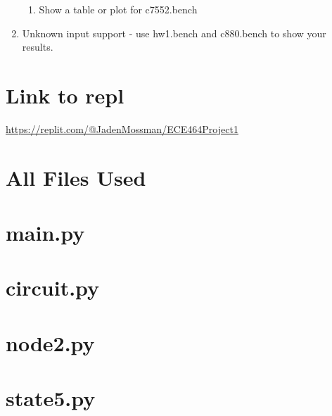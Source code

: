 \documentclass{article}
\begin{document}
\begin{enumerate}[label=\Alph*.]
\begin{enumerate}[label=\roman*.]
                \item Show a table or plot for c7552.bench
                
            \end{enumerate}
            
            \item Unknown input support - use hw1.bench and c880.bench to show your results.
        \end{enumerate}

    \section{Link to repl}
        \url{https://replit.com/@JadenMossman/ECE464Project1}
    
    \newpage
    \section{All Files Used}
        \newcommand{\FileUsed}[1]{\section*{ #1 }}
        \FileUsed{main.py}
        \FileUsed{circuit.py}
        \FileUsed{node2.py}
        \FileUsed{state5.py}
\end{document}
